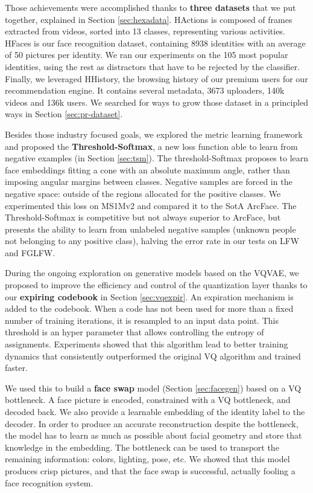 Those achievements were accomplished thanks to \textbf{three datasets} that we put together, explained in Section \ref{sec:hexadata}. HActions is composed of frames extracted from videos, sorted into 13 classes, representing various activities. HFaces is our face recognition dataset, containing 8938 identities with an average of 50 pictures per identity. We ran our experiments on the 105 most popular identities, using the rest as distractors that have to be rejected by the classifier. Finally, we leveraged HHistory, the browsing history of our premium users for our recommendation engine. It contains several metadata, 3673 uploaders, 140k videos and 136k users. We searched for ways to grow those dataset in a principled ways in Section \ref{sec:pr-dataset}.

Besides those industry focused goals, we explored the metric learning framework and proposed the \textbf{Threshold-Softmax}, a new loss function able to learn from negative examples (in Section \ref{sec:tsm}). The threshold-Softmax proposes to learn face embeddings fitting a cone with an absolute maximum angle, rather than imposing angular margins between classes. Negative samples are forced in the negative space: outside of the regions allocated for the positive classes. We experimented this loss on MS1Mv2 and compared it to the \ac{SotA} ArcFace. The Threshold-Softmax is competitive but not always superior to ArcFace, but presents the ability to learn from unlabeled negative samples (unknown people not belonging to any positive class), halving the error rate in our tests on LFW and FGLFW.

During the ongoing exploration on generative models based on the \ac{VQVAE}, we proposed to improve the efficiency and control of the quantization layer thanks to our \textbf{expiring codebook} in Section \ref{sec:vqexpir}. An expiration mechanism is added to the codebook. When a code has not been used for more than a fixed number of training iterations, it is resampled to an input data point. This threshold is an hyper parameter that allows controlling the entropy of assignments. Experiments showed that this algorithm lead to better training dynamics that consistently outperformed the original \ac{VQ} algorithm and trained faster.

We used this to build a \textbf{face swap} model (Section \ref{sec:facegen}) based on a \ac{VQ} bottleneck. A face picture is encoded, constrained with a \ac{VQ} bottleneck, and decoded back. We also provide a learnable embedding of the identity label to the decoder. In order to produce an accurate reconstruction despite the bottleneck, the model has to learn as much as possible about facial geometry and store that knowledge in the embedding. The bottleneck can be used to transport the remaining information: colors, lighting, pose, etc. We showed that this model produces crisp pictures, and that the face swap is successful, actually fooling a face recognition system.

